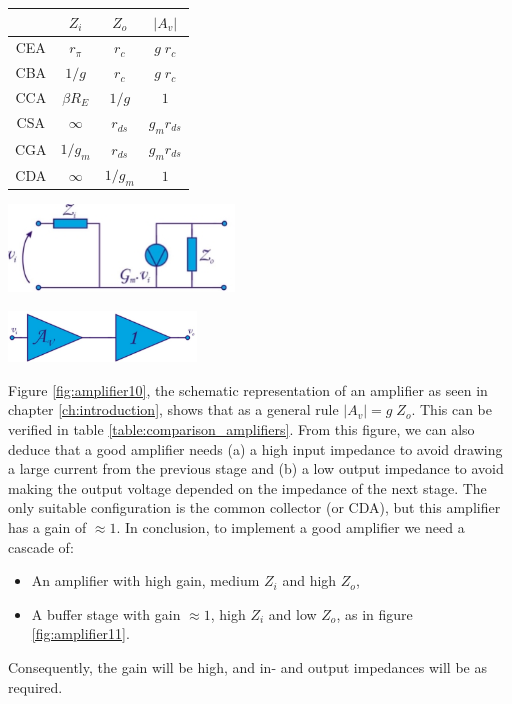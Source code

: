 \begin{center}
	\begin{tabular}{||c | c | c | c||} 
		\hline
		& $Z_i$ & $Z_o$ & $|A_v|$ \\ [0.5ex] 
		\hline\hline
		CEA & $r_{\pi}$ & $r_c$ & $g\;r_c$ \\ 
		\hline
		CBA & $1/g$ & $r_c$ & $g\;r_c$ \\
		\hline
		CCA & $\beta R_E$ & $1/g$ & $1$ \\
		\hline
		CSA & $\infty$ & $r_{ds}$ & $g_m r_{ds}$ \\
		\hline
		CGA & $1/g_m$ & $r_{ds}$ & $g_m r_{ds}$ \\ 
		\hline
		CDA & $\infty$ & $1/g_m$ & $1$ \\ 
		\hline
	\end{tabular}
	\label{table:comparison_amplifiers}
\end{center}

\begin{minipage}{.5\textwidth}
	\centering
	\includegraphics[width=6cm]{figures/ch02/amplifier10.jpg}
	\label{fig:amplifier10}
\end{minipage}%
\begin{minipage}{.5\textwidth}
	\centering
	\includegraphics[width=5cm]{figures/ch02/amplifier11.jpg}
	\label{fig:amplifier11}
\end{minipage}
Figure \ref{fig:amplifier10}, the schematic representation of an amplifier as seen in chapter \ref{ch:introduction}, shows that as a general rule $|A_v| = g\;Z_o$. This can be verified in table \ref{table:comparison_amplifiers}. From this figure, we can also deduce that a good amplifier needs (a) a high input impedance to avoid drawing a large current from the previous stage and (b) a low output impedance to avoid making the output voltage depended on the impedance of the next stage. The only suitable configuration is the common collector (or CDA), but this amplifier has a gain of $\approx 1$. In conclusion, to implement a good amplifier we need a cascade of:
\begin{itemize}
	\item An amplifier with high gain, medium $Z_i$ and high $Z_o$,
	\item A buffer stage with gain $\approx 1$, high $Z_i$ and low $Z_o$, as in figure \ref{fig:amplifier11}.
\end{itemize}
Consequently, the gain will be high, and in- and output impedances will be as required.

